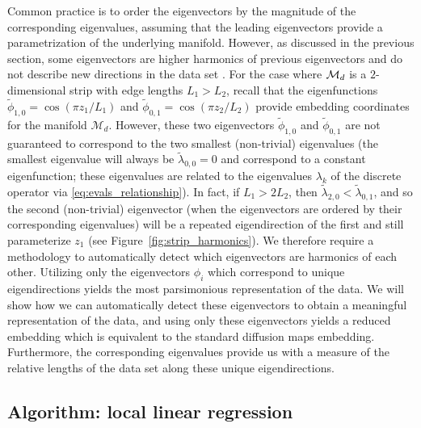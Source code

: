 Common practice is to order the eigenvectors by the magnitude of the corresponding eigenvalues, assuming that the leading eigenvectors provide a parametrization of the underlying manifold.
%
However, as discussed in the previous section, some eigenvectors are higher harmonics of previous eigenvectors and do not describe new directions in the data set \cite{gerber2007robust}.
%
For the case where $\mathcal{M}_d$ is a $2$-dimensional strip with edge lengths $L_1  > L_2$, recall that the eigenfunctions $\tilde{\phi}_{1,0} = \cos \left(  {\pi z_1}/{L_1} \right)$ and  $\tilde{\phi}_{0,1} = \cos \left(  {\pi z_2}/{L_2} \right)$ provide embedding coordinates for the manifold $\mathcal{M}_d$.
%
However, these two eigenvectors $\tilde{\phi}_{1, 0}$ and $\tilde{\phi}_{0, 1}$ are not guaranteed to correspond to the two smallest (non-trivial) eigenvalues (the smallest eigenvalue will always be $\tilde{\lambda}_{0,0} = 0$ and correspond to a constant eigenfunction; these eigenvalues are related to the eigenvalues $\lambda_k$ of the discrete operator via \eqref{eq:evals_relationship}).
%
In fact, if $L_1 > 2 L_2$, then $\tilde{\lambda}_{2, 0} < \tilde{\lambda}_{0, 1}$, and so the second (non-trivial) eigenvector (when the eigenvectors are ordered by their corresponding eigenvalues) will be a repeated eigendirection of the first and still parameterize $z_1$ (see Figure~\ref{fig:strip_harmonics}).
%
We therefore require a methodology to automatically detect which eigenvectors are harmonics of each other.
%
Utilizing only the eigenvectors $\phi_i$ which correspond to unique eigendirections yields the most parsimonious representation of the data.
%
We will show how we can automatically detect these eigenvectors to obtain a meaningful representation of the data, and using only these eigenvectors yields a reduced embedding which is equivalent to the standard diffusion maps embedding.
%
Furthermore, the corresponding eigenvalues provide us with a measure of the relative lengths of the data set along these unique eigendirections.


\subsection{Algorithm: local linear regression}

